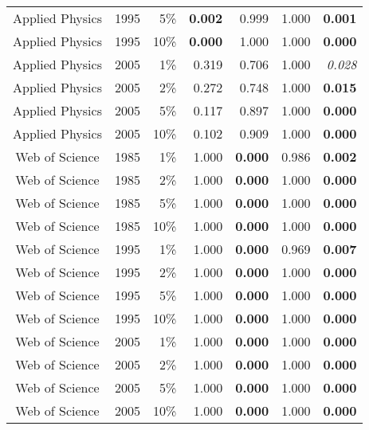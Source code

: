 \documentclass{article}
\begin{document}
\begin{table}
\begin{centering}
{\begin{tabular}{|c rrrrr r|}
Applied Physics & 1995 & 5\% & \textbf{0.002} & 0.999 & 1.000 & \textbf{0.001} \\ 
Applied Physics & 1995 & 10\% & \textbf{0.000} & 1.000 & 1.000 & \textbf{0.000} \\ 
Applied Physics & 2005 & 1\% & 0.319 & 0.706 & 1.000 & \textit{0.028} \\ 
Applied Physics & 2005 & 2\% & 0.272 & 0.748 & 1.000 & \textbf{0.015} \\ 
Applied Physics & 2005 & 5\% & 0.117 & 0.897 & 1.000 & \textbf{0.000} \\ 
Applied Physics & 2005 & 10\% & 0.102 & 0.909 & 1.000 & \textbf{0.000} \\ 
Web of Science & 1985 & 1\% & 1.000 & \textbf{0.000} & 0.986 & \textbf{0.002} \\ 
Web of Science & 1985 & 2\% & 1.000 & \textbf{0.000} & 1.000 & \textbf{0.000} \\ 
Web of Science & 1985 & 5\% & 1.000 & \textbf{0.000} & 1.000 & \textbf{0.000} \\ 
Web of Science & 1985 & 10\% & 1.000 & \textbf{0.000} & 1.000 & \textbf{0.000} \\ 
Web of Science & 1995 & 1\% & 1.000 & \textbf{0.000} & 0.969 & \textbf{0.007} \\ 
Web of Science & 1995 & 2\% & 1.000 & \textbf{0.000} & 1.000 & \textbf{0.000} \\ 
Web of Science & 1995 & 5\% & 1.000 & \textbf{0.000} & 1.000 & \textbf{0.000} \\ 
Web of Science & 1995 & 10\% & 1.000 & \textbf{0.000} & 1.000 & \textbf{0.000} \\ 
Web of Science & 2005 & 1\% & 1.000 & \textbf{0.000} & 1.000 & \textbf{0.000} \\ 
Web of Science & 2005 & 2\% & 1.000 & \textbf{0.000} & 1.000 & \textbf{0.000} \\ 
Web of Science & 2005 & 5\% & 1.000 & \textbf{0.000} & 1.000 & \textbf{0.000} \\ 
Web of Science & 2005 & 10\% & 1.000 & \textbf{0.000} & 1.000 & \textbf{0.000} \\ 
\hline
\end{tabular}} 
\end{centering}
\end{table}

\end{document}
